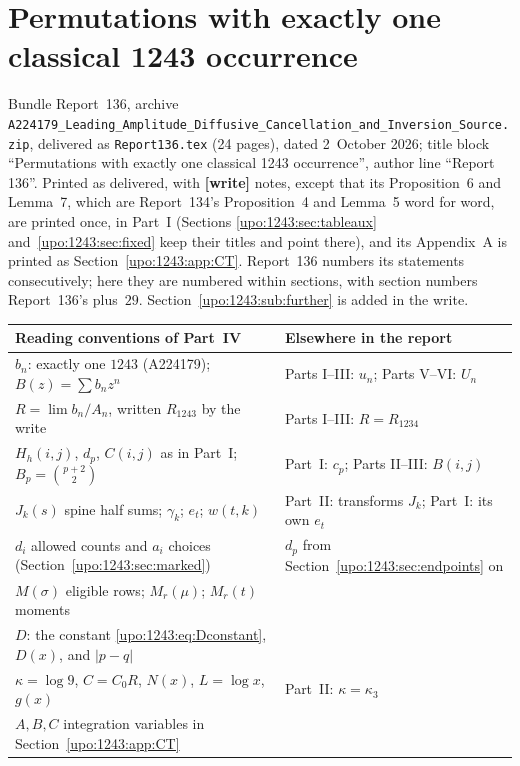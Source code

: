 \documentclass[11pt,letterpaper]{article}
\theoremstyle{remark}\newtheorem{remark}[theorem]{Remark}
\numberwithin{equation}{section}
\newcommand{\file}[1]{\nolinkurl{#1}}
\newcommand{\partsource}[1]{\par\noindent\begin{minipage}{\textwidth}\small #1\end{minipage}\par\medskip}
\begin{document}
\clearpage
\part{Permutations with exactly one classical 1243 occurrence}\label{upo:1243:part}
\partsource{Bundle Report~136, archive \file{A224179_Leading_Amplitude_Diffusive_Cancellation_and_Inversion_Source.zip}, delivered as \file{Report136.tex} (24 pages), dated 2~October 2026; title block ``Permutations with exactly one classical 1243 occurrence'', author line ``Report 136''. Printed as delivered, with \textbf{[write]} notes, except that its Proposition~6 and Lemma~7, which are Report~134's Proposition~4 and Lemma~5 word for word, are printed once, in Part~I (Sections \ref{upo:1243:sec:tableaux} and~\ref{upo:1243:sec:fixed} keep their titles and point there), and its Appendix~A is printed as Section~\ref{upo:1243:app:CT}. Report~136 numbers its statements consecutively; here they are numbered within sections, with section numbers Report~136's plus~$29$. Section~\ref{upo:1243:sub:further} is added in the write.}
\begin{center}
\small
\begin{tabular}{@{}>{\raggedright\arraybackslash}p{} >{\raggedright\arraybackslash}p{}@{}}
\toprule
Reading conventions of Part~IV & Elsewhere in the report\\
\midrule
$b_n$: exactly one $1243$ (A224179); $B(z)=\sum b_nz^n$ & Parts I--III: $u_n$; Parts V--VI: $U_n$\\
$R=\lim b_n/A_n$, written $R_{1243}$ by the write & Parts I--III: $R=R_{1234}$\\
$H_h(i,j)$, $d_p$, $C(i,j)$ as in Part~I; $B_p=\binom{p+2}2$ & Part~I: $c_p$; Parts II--III: $B(i,j)$\\
$J_k(s)$ spine half sums; $\gamma_k$; $e_t$; $w(t,k)$ & Part~II: transforms $J_k$; Part~I: its own $e_t$\\
$d_i$ allowed counts and $a_i$ choices (Section~\ref{upo:1243:sec:marked}) & $d_p$ from Section~\ref{upo:1243:sec:endpoints} on\\
$M(\sigma)$ eligible rows; $M_r(\mu)$; $M_r(t)$ moments & \\
$D$: the constant \eqref{upo:1243:eq:Dconstant}, $D(x)$, and $|p-q|$ & \\
$\kappa=\log9$, $C=C_0R$, $N(x)$, $L=\log x$, $g(x)$ & Part~II: $\kappa=\kappa_3$\\
$A,B,C$ integration variables in Section~\ref{upo:1243:app:CT} & \\
\bottomrule
\end{tabular}
\end{center}
\end{document}
